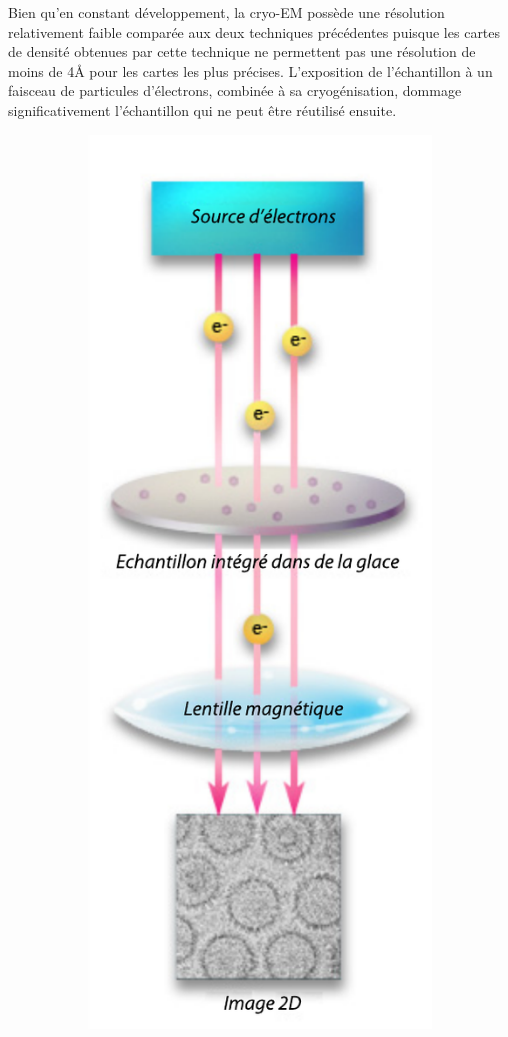 Bien qu'en constant développement, la cryo-EM possède une résolution relativement faible comparée aux deux techniques précédentes puisque les cartes de densité obtenues par cette technique ne permettent pas une résolution de moins de 4\r{A} pour les cartes les plus précises\cite{zhou_atomic_2011}. L'exposition de l'échantillon à un faisceau de particules d'électrons, combinée à sa cryogénisation, dommage significativement l'échantillon qui ne peut être réutilisé ensuite.

\begin{figure}
  \begin{subfigure}{.5\textwidth}
  \centering
  {\includegraphics[width=0.6\linewidth]{./figures/ch1/cryoem.pdf}}
    \label{Fig:cryoem}
  \end{subfigure}

\end{figure}
